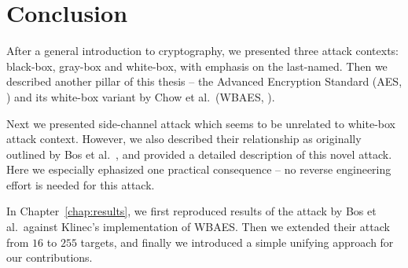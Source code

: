 \cleardoublepage{}

\chapter*{Conclusion}
\label{chap:concl}

After a general introduction to cryptography, we presented three attack contexts: black-box, gray-box and white-box, with emphasis on the last-named. Then we described another pillar of this thesis -- the Advanced Encryption Standard (AES, \cite{fips2001aes}) and its white-box variant by Chow et al.\ (WBAES, \cite{chow2002aes}).

Next we presented side-channel attack which seems to be unrelated to white-box attack context. However, we also described their relationship as originally outlined by Bos et al.\ \cite{bos2015differential}, and provided a detailed description of this novel attack. Here we especially ephasized one practical consequence -- no reverse engineering effort is needed for this attack.

In Chapter~\ref{chap:results}, we first reproduced results of the attack by Bos et al.\ against Klinec's implementation \cite{klinec2013implementation} of WBAES. Then we extended their attack from $16$ to $255$ targets, and finally we introduced a simple unifying approach for our contributions.

